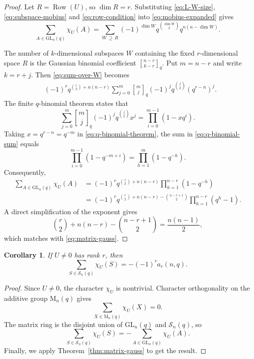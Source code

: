 \documentclass[11pt]{article}
\newtheorem{corollary}[theorem]{Corollary}
\theoremstyle{definition}
\DeclareMathOperator{\Row}{Row}
\newcommand{\Mat}{\mathrm{M}}
\newcommand{\GL}{\mathrm{GL}}
\newcommand{\cS}{\mathcal{S}}
\newcommand{\qbinom}[2]{\genfrac{[}{]}{0pt}{}{#1}{#2}_{q}}
\begin{document}
\begin{proof}
Let $R=\Row(U)$, so $\dim R=r$.  Substituting \eqref{eq:L-W-size}, \eqref{eq:subspace-mobius} and \eqref{eq:row-condition} into \eqref{eq:mobius-expanded} gives
\begin{equation}\label{eq:sum-over-W}
 \sum_{A\in\GL_n(q)}\chi_U(A)
 =\sum_{W\,\supseteq\,R}
  (-1)^{\dim W}q^{\binom{\dim W}{2}}q^{n(n-\dim W)}.
\end{equation}

The number of $k$-dimensional subspaces $W$ containing the fixed $r$-dimensional space $R$ is the Gaussian binomial coefficient
$\qbinom{n-r}{k-r}$.  Put $m=n-r$ and write $k=r+j$.  Then \eqref{eq:sum-over-W} becomes
\begin{align}
 &(-1)^r q^{\binom r2+n(n-r)}
 \sum_{j=0}^{m}
 \qbinom{m}{j}(-1)^j q^{\binom j2}(q^{r-n})^j.             \label{eq:q-binomial-sum}
\end{align}
The finite $q$-binomial theorem states that
\begin{equation}\label{eq:q-binomial-theorem}
  \sum_{j=0}^{m}\qbinom{m}{j}(-1)^j q^{\binom j2}x^j
  =\prod_{i=0}^{m-1}(1-xq^i).
\end{equation}
Taking $x=q^{r-n}=q^{-m}$ in \eqref{eq:q-binomial-theorem}, the sum in \eqref{eq:q-binomial-sum} equals
\[
  \prod_{i=0}^{m-1}(1-q^{-m+i})
  =\prod_{h=1}^{m}(1-q^{-h}).
\]
Consequently,
\begin{align*}
 \sum_{A\in\GL_n(q)}\chi_U(A)
 &=(-1)^r q^{\binom r2+n(n-r)}
   \prod_{h=1}^{n-r}(1-q^{-h})\\
 &=(-1)^r q^{\binom r2+n(n-r)-\binom{n-r+1}{2}}
   \prod_{h=1}^{n-r}(q^h-1).
\end{align*}
A direct simplification of the exponent gives
\[
  \binom r2+n(n-r)-\binom{n-r+1}{2}
  =\frac{n(n-1)}{2},
\]
which matches with \eqref{eq:matrix-gauss}.
\end{proof}

\begin{corollary}\label{cor:singular-character-sum}
If $U\ne0$ has rank $r$, then
\begin{equation}\label{eq:singular-character-sum}
  \sum_{S\in\cS_n(q)}\chi_U(S)
  =-(-1)^r a_r(n,q).
\end{equation}
\end{corollary}

\begin{proof}
Since $U\ne0$, the character $\chi_U$ is nontrivial.  Character orthogonality on the additive group $\Mat_n(q)$ gives
\[
  \sum_{X\in\Mat_n(q)}\chi_U(X)=0.
\]
The matrix ring is the disjoint union of $\GL_n(q)$ and $\cS_n(q)$, so
\[
  \sum_{S\in\cS_n(q)}\chi_U(S)
  =-\sum_{A\in\GL_n(q)}\chi_U(A).
\]
Finally, we apply Theorem~\ref{thm:matrix-gauss} to get the result.
\end{proof}
\end{document}
